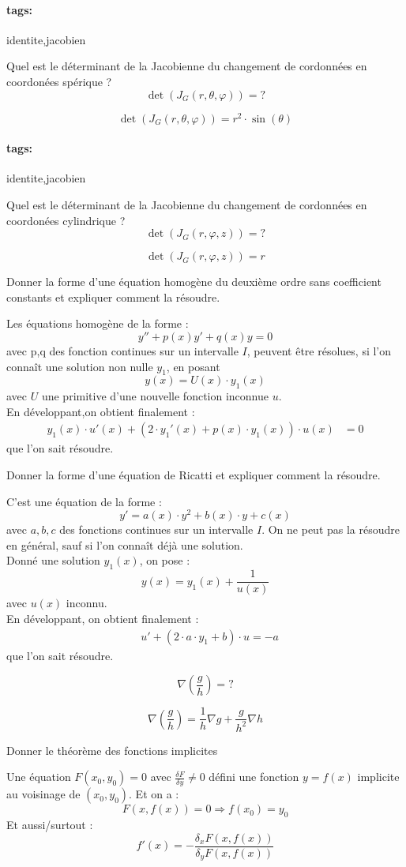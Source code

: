\documentclass[12pt]{article}
\newcommand*{\xfield}[1]{\begin{mdframed}\centering #1\end{mdframed}\bigskip}
\newenvironment{note}{}{}
\newcommand*{\tags}[1]{\paragraph{tags: }#1}
\begin{document}
\begin{note}
	\tags{identite,jacobien}
	\xfield{Quel est le déterminant de la Jacobienne du changement de cordonnées en coordonées spérique ?\\
	$$\det(J_G(r,\theta,\varphi)) = ?$$}
	\xfield{$$\det(J_G(r,\theta,\varphi)) = r^2 \cdot \sin(\theta)$$}
\end{note}
\begin{note}
	\tags{identite,jacobien}
	\xfield{Quel est le déterminant de la Jacobienne du changement de cordonnées en coordonées cylindrique ?\\
	$$\det(J_G(r,\varphi,z)) = ?$$}
	\xfield{$$\det(J_G(r,\varphi,z)) = r$$}
\end{note}
\begin{note}
	\xfield{Donner la forme d'une équation homogène du deuxième ordre sans coefficient constants et expliquer comment la résoudre.}
	\xfield{Les équations homogène de la forme :
$$y''+p(x)y'+q(x)y=0$$
avec p,q des fonction continues sur un intervalle $I$, peuvent être résolues, si l'on connaît une solution non nulle $y_1$, en posant
$$y(x) = U(x)\cdot y_1(x)$$
avec $U$ une primitive d'une nouvelle fonction inconnue $u$.\\
En développant,on obtient finalement :
\begin{align*}
y_1(x) \cdot u'(x) + (2\cdot y_1'(x) + p(x)\cdot y_1(x))\cdot u(x) &= 0
\end{align*}
que l'on sait résoudre.}
\end{note}
\begin{note}
	\xfield{Donner la forme d'une équation de Ricatti et expliquer comment la résoudre.}
	\xfield{C'est une équation de la forme :
$$y'=a(x)\cdot y^2 + b(x) \cdot y+c(x)$$
avec $a,b,c$ des fonctions continues sur un intervalle $I$.
On ne peut pas la résoudre en général, sauf si l'on connaît déjà une solution.\\
Donné une solution $y_1(x)$, on pose :
$$y(x)=y_1(x)+\frac{1}{u(x)}$$
avec $u(x)$ inconnu.\\
En développant, on obtient finalement :
\begin{align*}
&u'+(2\cdot a \cdot y_1 + b)\cdot u = -a
\end{align*}que l'on sait résoudre.}
\end{note}
\begin{note}
\xfield{$$\nabla \left( \frac{g}{h} \right) =  ?$$}
\xfield{$$\nabla \left( \frac{g}{h} \right) = \frac{1}{h}\nabla g + \frac{g}{h^2} \nabla h$$ }
\end{note}
\begin{note}
\xfield{Donner le théorème des fonctions implicites}
\xfield{Une équation $F(x_0,y_0) = 0$ avec $\frac{\delta F}{\delta y} \neq 0$ défini une fonction $y=f(x)$ implicite au voisinage de $(x_0,y_0)$. Et on a :
$$F(x, f(x)) = 0 \Rightarrow f(x_0) = y_0$$
Et aussi/surtout :
$$f'(x) = - \frac{\delta_xF (x,f(x))}{\delta_yF(x,f(x))}$$}
\end{note}
\end{document}
